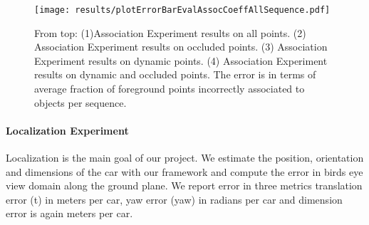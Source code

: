 \begin{figure*}
\texttt{[image: results/plotErrorBarEvalAssocCoeffAllSequence.pdf]}
  \caption{From top: (1)Association Experiment results on all points. %
    (2) Association Experiment results on occluded points. %
    (3) Association Experiment results on dynamic points. %
    (4) Association Experiment results on dynamic  and occluded points. The error is in terms of average fraction of foreground points incorrectly associated to objects per sequence. } \label{fig:assoc-occ-results}
\end{figure*}


\paragraph{Localization Experiment}
Localization is the main goal of our project. We estimate the position, orientation and dimensions of the car with our framework and compute the error in birds eye view domain along the ground plane. We report error in three metrics translation error (t) in meters per car, yaw error (yaw) in radians per car and dimension error is again meters per car.

